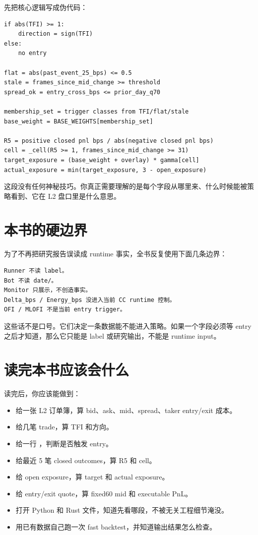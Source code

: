 先把核心逻辑写成伪代码：

\begin{lstlisting}
if abs(TFI) >= 1:
    direction = sign(TFI)
else:
    no entry

flat = abs(past_event_25_bps) <= 0.5
stale = frames_since_mid_change >= threshold
spread_ok = entry_cross_bps <= prior_day_q70

membership_set = trigger classes from TFI/flat/stale
base_weight = BASE_WEIGHTS[membership_set]

R5 = positive closed pnl bps / abs(negative closed pnl bps)
cell = _cell(R5 >= 1, frames_since_mid_change >= 31)
target_exposure = (base_weight + overlay) * gamma[cell]
actual_exposure = min(target_exposure, 3 - open_exposure)
\end{lstlisting}

这段没有任何神秘技巧。你真正需要理解的是每个字段从哪里来、什么时候能被策略看到、它在 L2 盘口里是什么意思。

\section{本书的硬边界}

为了不再把研究报告误读成 runtime 事实，全书反复使用下面几条边界：

\begin{lstlisting}
Runner 不读 label。
Bot 不读 date/。
Monitor 只展示，不创造事实。
Delta_bps / Energy_bps 没进入当前 CC runtime 控制。
OFI / MLOFI 不是当前 entry trigger。
\end{lstlisting}

这些话不是口号。它们决定一条数据能不能进入策略。如果一个字段必须等 entry 之后才知道，那么它只能是 label 或研究输出，不能是 runtime input。

\section{读完本书应该会什么}

读完后，你应该能做到：

\begin{itemize}[leftmargin=2em]
  \item 给一张 L2 订单簿，算 bid、ask、mid、spread、taker entry/exit 成本。
  \item 给几笔 trade，算 TFI 和方向。
  \item 给一行 ，判断是否触发 entry。
  \item 给最近 5 笔 closed outcomes，算 R5 和 cell。
  \item 给 open exposure，算 target 和 actual exposure。
  \item 给 entry/exit quote，算 fixed60 mid 和 executable PnL。
  \item 打开 Python 和 Rust 文件，知道先看哪段，不被无关工程细节淹没。
  \item 用已有数据自己跑一次 fast backtest，并知道输出结果怎么检查。
\end{itemize}


